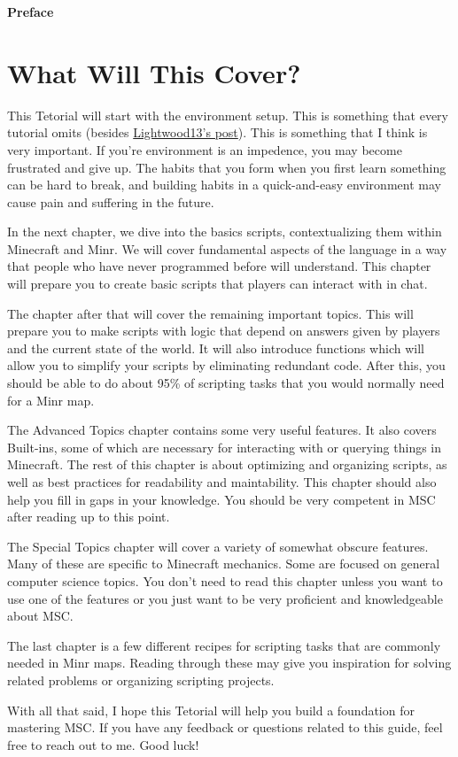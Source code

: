 \documentclass[oneside]{book}
\newcommand{\prefacename}{Preface}
\newenvironment{preface}{
    \vspace*{\stretch{2}}
    {\noindent \bfseries \Huge \prefacename}
    \begin{center}
        \phantomsection \addcontentsline{toc}{chapter}{\prefacename} %
        \thispagestyle{plain}
    \end{center}%
}
{\vspace*{\stretch{5}}}
\begin{document}
\begin{preface}
\section*{What Will This Cover?}
This Tetorial will start with the environment setup. This is something that every tutorial omits (besides \href{https://forums.minr.org/threads/visual-studio-code-extension-for-minr-scripts.6175/}{Lightwood13's post}). This is something that I think is very important. If you're environment is an impedence, you may become frustrated and give up. The habits that you form when you first learn something can be hard to break, and building habits in a quick-and-easy environment may cause pain and suffering in the future.

In the next chapter, we dive into the basics scripts, contextualizing them within Minecraft and Minr. We will cover fundamental aspects of the language in a way that people who have never programmed before will understand. This chapter will prepare you to create basic scripts that players can interact with in chat.

The chapter after that will cover the remaining important topics. This will prepare you to make scripts with logic that depend on answers given by players and the current state of the world. It will also introduce functions which will allow you to simplify your scripts by eliminating redundant code. After this, you should be able to do about 95\% of scripting tasks that you would normally need for a Minr map.

The Advanced Topics chapter contains some very useful features. It also covers Built-ins, some of which are necessary for interacting with or querying things in Minecraft. The rest of this chapter is about optimizing and organizing scripts, as well as best practices for readability and maintability. This chapter should also help you fill in gaps in your knowledge. You should be very competent in MSC after reading up to this point.

The Special Topics chapter will cover a variety of somewhat obscure features. Many of these are specific to Minecraft mechanics. Some are focused on general computer science topics. You don't need to read this chapter unless you want to use one of the features or you just want to be very proficient and knowledgeable about MSC.

The last chapter is a few different recipes for scripting tasks that are commonly needed in Minr maps. Reading through these may give you inspiration for solving related problems or organizing scripting projects.

With all that said, I hope this Tetorial will help you build a foundation for mastering MSC. If you have any feedback or questions related to this guide, feel free to reach out to me. Good luck!

\end{preface}
\end{document}
